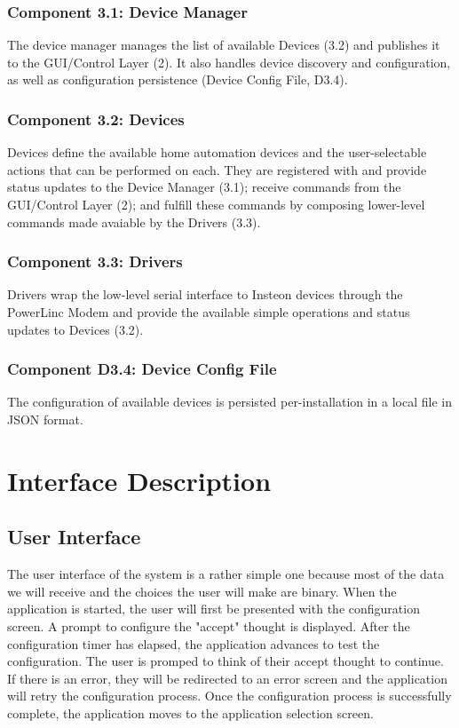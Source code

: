 \documentclass{article}
\begin{document}
\subsubsection{Component 3.1: Device Manager}
The device manager manages the list of available Devices (3.2) and publishes
it to the GUI/Control Layer (2). It also handles device discovery and
configuration, as well as configuration persistence (Device Config File,
D3.4).

\subsubsection{Component 3.2: Devices}
Devices define the available home automation devices and the user-selectable
actions that can be performed on each. They are registered with and provide
status updates to the Device Manager (3.1); receive commands from the
GUI/Control Layer (2); and fulfill these commands by composing lower-level
commands made avaiable by the Drivers (3.3).

\subsubsection{Component 3.3: Drivers}
Drivers wrap the low-level serial interface to Insteon devices through the
PowerLinc Modem and provide the available simple operations and status updates
to Devices (3.2).

\subsubsection{Component D3.4: Device Config File}
The configuration of available devices is persisted per-installation in a
local file in JSON format.

\newpage

\section{Interface Description}

\subsection{User Interface}

The user interface of the system is a rather simple one because most of the data we will receive and the choices the user will make are binary. When the application is started, the user will first be presented with the configuration screen. A prompt to configure the "accept" thought is displayed. After the configuration timer has elapsed, the application advances to test the configuration. The user is promped to think of their accept thought to continue. If there is an error, they will be redirected to an error screen and the application will retry the configuration process. Once the configuration process is successfully complete, the application moves to the application selection screen. 
\end{document}
